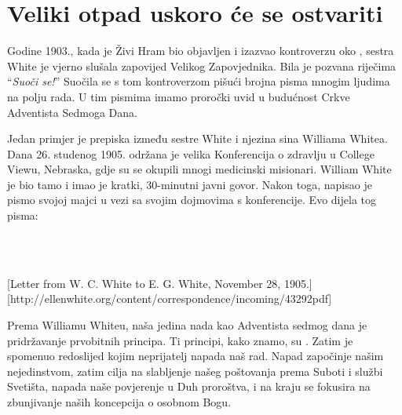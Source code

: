 \chapter{Veliki otpad uskoro će se ostvariti} \label{chap:apostasy}

Godine 1903., kada je Živi Hram bio objavljen i izazvao kontroverzu oko , sestra White je vjerno slušala zapovijed Velikog Zapovjednika. Bila je pozvana riječima “\textit{Suoči se!}” Suočila se s tom kontroverzom pišući brojna pisma mnogim ljudima na polju rada. U tim pismima imamo proročki uvid u budućnost Crkve Adventista Sedmoga Dana.

Jedan primjer je prepiska između sestre White i njezina sina Williama Whitea. Dana 26. studenog 1905. održana je velika Konferencija o zdravlju u College Viewu, Nebraska, gdje su se okupili mnogi medicinski misionari. William White je bio tamo i imao je kratki, 30-minutni javni govor. Nakon toga, napisao je pismo svojoj majci u vezi sa svojim dojmovima s konferencije. Evo dijela tog pisma:

 \\
 \\

[Letter from W. C. White to E. G. White, November 28, 1905.][http://ellenwhite.org/content/correspondence/incoming/43292pdf]

Prema Williamu Whiteu, naša jedina nada kao Adventista sedmog dana je pridržavanje prvobitnih principa. Ti principi, kako znamo, su . Zatim je spomenuo redoslijed kojim neprijatelj napada naš rad. Napad započinje našim nejedinstvom, zatim cilja na slabljenje našeg poštovanja prema Suboti i službi Svetišta, napada naše povjerenje u Duh proroštva, i na kraju se fokusira na zbunjivanje naših koncepcija o osobnom Bogu.

